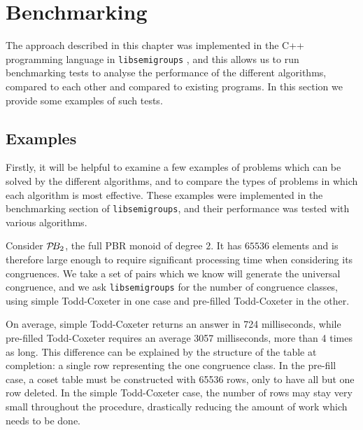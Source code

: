 

\section{Benchmarking}
\label{sec:benchmarking}

The approach described in this chapter was implemented in the C++ programming
language in \texttt{libsemigroups} \cite{libsemigroups}, and this allows us to
run benchmarking tests to analyse the performance of the different algorithms,
compared to each other and compared to existing programs.  In this section we
provide some examples of such tests.

\subsection{Examples}
Firstly, it will be helpful to examine a few examples of problems which can be
solved by the different algorithms, and to compare the types of problems in
which each algorithm is most effective.  These examples were implemented in the
benchmarking section of \texttt{libsemigroups}, and their performance was tested
with various algorithms.

\begin{example}
  \label{ex:good-tc}
  Consider $\mathcal{P}\!B_2$, the full PBR monoid of degree $2$.  It has $65536$ elements
  and is therefore large enough to require significant processing time when
  considering its congruences.   We take a set of pairs which we know will
  generate the universal congruence, and we ask \texttt{libsemigroups} for the
  number of congruence classes, using simple Todd-Coxeter in one case and
  pre-filled Todd-Coxeter in the other.

  On average, simple Todd-Coxeter returns an answer in 724 milliseconds, while
  pre-filled Todd-Coxeter requires an average 3057 milliseconds, more than 4
  times as long.  This difference can be explained by the structure
  of the table at completion: a single row representing the one congruence
  class.  In the pre-fill case, a coset table must be constructed with 65536
  rows, only to have all but one row deleted.  In the simple Todd-Coxeter case,
  the number of rows may stay very small throughout the procedure, drastically
  reducing the amount of work which needs to be done.
\end{example}

